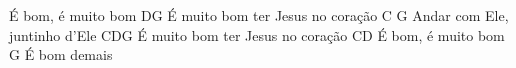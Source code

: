 É bom, é muito bom
DG É muito bom ter Jesus no coração
C G Andar com Ele, juntinho d’Ele
CDG
É muito bom ter Jesus no coração
CD É bom, é muito bom
G
É bom demais
